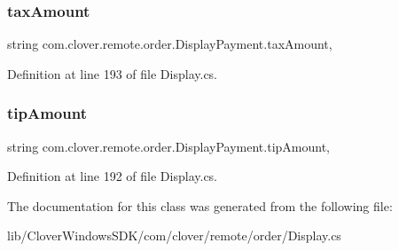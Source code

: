 \subsubsection{\texorpdfstring{tax\+Amount}{taxAmount}}
{\footnotesize\ttfamily string com.\+clover.\+remote.\+order.\+Display\+Payment.\+tax\+Amount\hspace{0.3cm}{\ttfamily [get]}, {\ttfamily [set]}}



Definition at line 193 of file Display.\+cs.

\mbox{\label{classcom_1_1clover_1_1remote_1_1order_1_1_display_payment_afa9552c29076962d4e9f74f9395f4b4b}} 
\subsubsection{\texorpdfstring{tip\+Amount}{tipAmount}}
{\footnotesize\ttfamily string com.\+clover.\+remote.\+order.\+Display\+Payment.\+tip\+Amount\hspace{0.3cm}{\ttfamily [get]}, {\ttfamily [set]}}



Definition at line 192 of file Display.\+cs.



The documentation for this class was generated from the following file\+:\begin{DoxyCompactItemize}
\item 
lib/\+Clover\+Windows\+S\+D\+K/com/clover/remote/order/Display.\+cs\end{DoxyCompactItemize}

